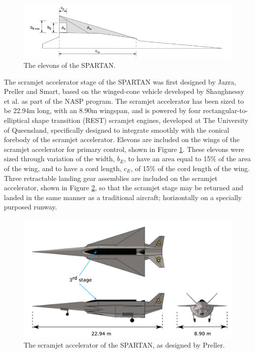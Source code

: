  \begin{figure}[ht]
 	\centering
 	\includegraphics[width=0.8\linewidth]{figures/2_literature-review/SPARTANElevons}
 	\caption{The elevons of the SPARTAN\cite{Preller2017b}.}
 	\label{fig:SPARTANElevons}
 \end{figure}
 
  The scramjet accelerator stage of the SPARTAN was first designed by Jazra, Preller and Smart\cite{Jazra2010, Jazra2013}, based on the winged-cone vehicle developed by Shaughnessy et al. as part of the NASP program\cite{Shaughnessy1990}. 
  The scramjet accelerator has been sized to be 22.94m long, with an 8.90m wingspan, and is powered by four rectangular-to-elliptical shape transition (REST) scramjet engines, developed at The University of Queensland, specifically designed to integrate smoothly with the conical forebody of the scramjet accelerator. Elevons are included on the wings of the scramjet accelerator for primary control, shown in Figure \ref{fig:SPARTANElevons}. These elevons were sized through variation of the width, $b_E$, to have an area equal to 15\% of the area of the wing, and to have a cord length, $c_E$, of 15\% of the cord length of the wing\cite{Preller2018a}.
  Three retractable landing gear assemblies are included on the scramjet accelerator, shown in Figure \ref{fig:SPARTAN-Dawid}, so that the scramjet stage may be returned and landed in the same manner as a traditional aircraft; horizontally on a specially purposed runway. 
  
  \begin{figure}[ht]
  	\centering
  	\includegraphics[width=0.9\linewidth]{figures/2_literature-review/SPARTAN-Dawid}
  	\caption{The scramjet accelerator of the SPARTAN, as designed by Preller\cite{Preller2018a}.}
  	\label{fig:SPARTAN-Dawid}
  \end{figure}
  
